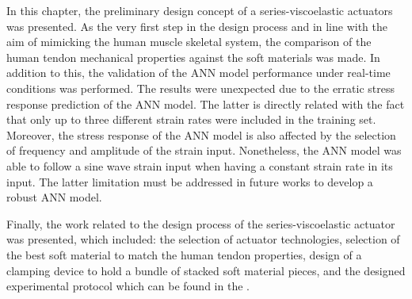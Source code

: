 In this chapter, the preliminary design concept of a series-viscoelastic actuators was presented. As the very first step in the design process and in line with the aim of mimicking the human muscle skeletal system, the comparison of the human tendon mechanical properties against the soft materials was made. In addition to this, the validation of the ANN model performance under real-time conditions was performed. The results were unexpected due to the erratic stress response prediction of the ANN model. The latter is directly related with the fact that only up to three different strain rates were included in the training set. Moreover, the stress response of the ANN model is also affected by the selection of frequency and amplitude of the strain input. Nonetheless, the ANN model was able to follow a sine wave strain input when having a constant strain rate in its input. The latter limitation must be addressed in future works to develop a robust ANN model.

Finally, the work related to the design process of the series-viscoelastic actuator was presented, which included: the selection of actuator technologies, selection of the best soft material to match the human tendon properties, design of a clamping device to hold a bundle of stacked soft material pieces, and the designed experimental protocol which can be found in the .